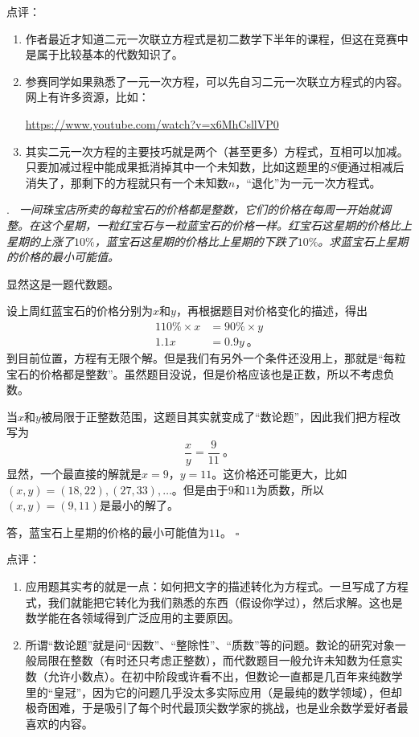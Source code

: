 \documentclass[a4,12pt]{article}
\newcounter{Problem}
\newcommand{\Problem}[2]{
		\vspace*{10pt}
		\label{Problem #1}
		\noindent#1.\emph{~#2}
	}
\newcommand{\Qed}{\hfill\ensuremath{\square}}
\begin{document}
	\noindent 点评：
	\begin{enumerate}[label=(\alph*)]
		\item 作者最近才知道二元一次联立方程式是初二数学下半年的课程，但这在竞赛中是属于比较基本的代数知识了。
		\item 参赛同学如果熟悉了一元一次方程，可以先自习二元一次联立方程式的内容。网上有许多资源，比如：
			\begin{center}\href{https://www.youtube.com/watch?v=x6MhCsllVP0}{https://www.youtube.com/watch?v=x6MhCsllVP0}\end{center}
		\item 其实二元一次方程的主要技巧就是两个（甚至更多）方程式，互相可以加减。只要加减过程中能成果抵消掉其中一个未知数，比如这题里的$S$便通过相减后消失了，那剩下的方程就只有一个未知数$n$，“退化”为一元一次方程式。
	\end{enumerate}

\pagebreak
\Problem{14}{
	一间珠宝店所卖的每粒宝石的价格都是整数，它们的价格在每周一开始就调整。在这个星期，一粒红宝石与一粒蓝宝石的价格一样。红宝石这星期的价格比上星期的上涨了$10\%$，蓝宝石这星期的价格比上星期的下跌了$10\%$。求蓝宝石上星期的价格的最小可能值。
	}

	显然这是一题代数题。

	设上周红蓝宝石的价格分别为$x$和$y$，再根据题目对价格变化的描述，得出
	\[ \begin{aligned}
			110\%\times x &= 90\%\times y \\
			1.1x &= 0.9y \ \mbox{。}
		\end{aligned}
	\]
	到目前位置，方程有无限个解。但是我们有另外一个条件还没用上，那就是“每粒宝石的价格都是整数”。虽然题目没说，但是价格应该也是正数，所以不考虑负数。

	当$x$和$y$被局限于正整数范围，这题目其实就变成了“数论题”，因此我们把方程改写为
	\[ \frac{x}{y} = \frac{9}{11} \ \mbox{。} \]
	显然，一个最直接的解就是$x=9$，$y=11$。这价格还可能更大，比如$(x, y) = (18, 22), (27, 33), \ldots$。但是由于$9$和$11$为质数，所以$(x, y) = (9, 11)$是最小的解了。

	答，蓝宝石上星期的价格的最小可能值为$11$。
	\Qed
	\vspace*{30pt}

	\noindent 点评：
	\begin{enumerate}[label=(\alph*)]
		\item 应用题其实考的就是一点：如何把文字的描述转化为方程式。一旦写成了方程式，我们就能把它转化为我们熟悉的东西（假设你学过），然后求解。这也是数学能在各领域得到广泛应用的主要原因。
		\item 所谓“数论题”就是问“因数”、“整除性”、“质数”等的问题。数论的研究对象一般局限在整数（有时还只考虑正整数），而代数题目一般允许未知数为任意实数（允许小数点）。在初中阶段或许看不出，但数论一直都是几百年来纯数学里的“皇冠”，因为它的问题几乎没太多实际应用（是最纯的数学领域），但却极奇困难，于是吸引了每个时代最顶尖数学家的挑战，也是业余数学爱好者最喜欢的内容。
	\end{enumerate}
\end{document}
